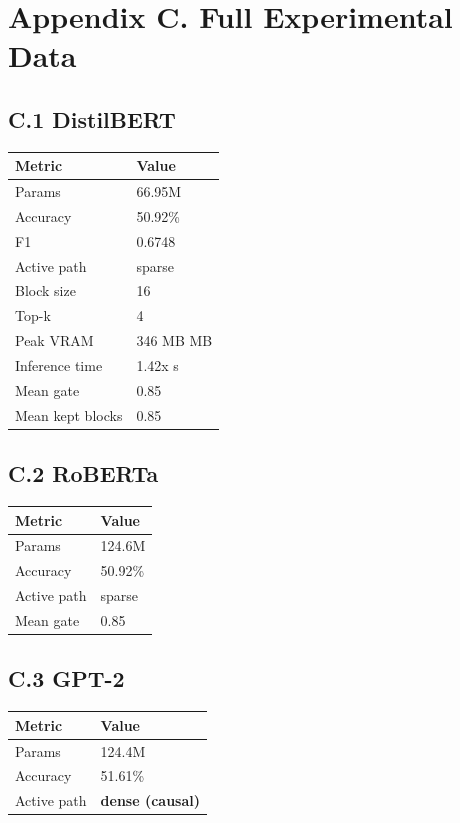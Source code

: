 \section{Appendix C. Full Experimental Data}

\subsection{C.1 DistilBERT}

\begin{table}[H]
\centering
\small
\begin{tabular}{ll}
\toprule
\textbf{Metric} & \textbf{Value} \\
\midrule
Params & 66.95M \\
Accuracy & 50.92\% \\
F1 & 0.6748 \\
Active path & sparse \\
Block size & 16 \\
Top-k & 4 \\
Peak VRAM & 346 MB MB \\
Inference time & 1.42x s \\
Mean gate & 0.85 \\
Mean kept blocks & 0.85 \\
\bottomrule
\end{tabular}
\end{table}

\subsection{C.2 RoBERTa}

\begin{table}[H]
\centering
\small
\begin{tabular}{ll}
\toprule
\textbf{Metric} & \textbf{Value} \\
\midrule
Params & 124.6M \\
Accuracy & 50.92\% \\
Active path & sparse \\
Mean gate & 0.85 \\
\bottomrule
\end{tabular}
\end{table}

\subsection{C.3 GPT-2}

\begin{table}[H]
\centering
\small
\begin{tabular}{ll}
\toprule
\textbf{Metric} & \textbf{Value} \\
\midrule
Params & 124.4M \\
Accuracy & 51.61\% \\
Active path & \textbf{dense (causal)} \\
\bottomrule
\end{tabular}
\end{table}

